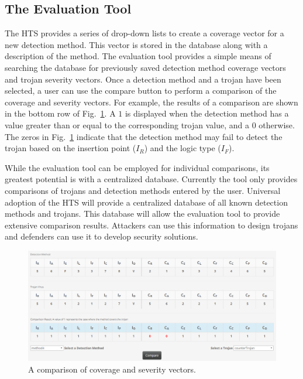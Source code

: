 \subsection{The Evaluation Tool} \label{sec:toolDetection}
The HTS provides a series of drop-down lists to create a coverage vector for a new detection method.
This vector is stored in the database along with a description of the method.
The evaluation tool provides a simple means of searching the database for previously saved detection method coverage vectors and trojan severity vectors.
Once a detection method and a trojan have been selected, a user can use the compare button to perform a comparison of the coverage and severity vectors.
For example, the results of a comparison are shown in the bottom row of Fig.~\ref{fig:comparison}.
A $1$ is displayed when the detection method has a value greater than or equal to the corresponding trojan value, and a $0$ otherwise.
The zeros in Fig.~\ref{fig:comparison} indicate that the detection method may fail to detect
the trojan based on the insertion point (\textit{$I_R$}) and the logic type (\textit{$I_F$}).

While the evaluation tool can be employed for individual comparisons, its greatest potential is with a centralized database.
Currently the tool only provides comparisons of trojans and detection methods entered by the user.
Universal adoption of the HTS will provide a centralized database of all known detection methods and trojans.
This database will allow the evaluation tool to provide extensive comparison results.
Attackers can use this information to design trojans and defenders can use it to develop security solutions.
\begin{figure}[]
	\centering
	\includegraphics[width=1\linewidth]{figures/comparison}
	\caption{A comparison of coverage and severity vectors.}
	\label{fig:comparison}
\end{figure}